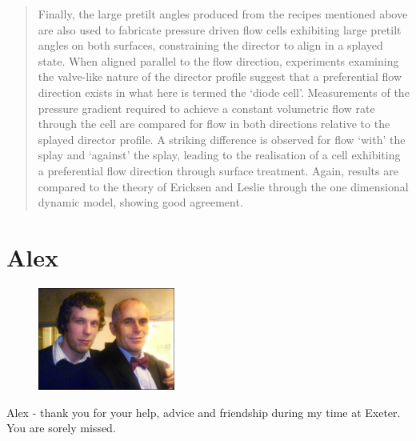 \documentclass[prb, reprint, superscriptaddress, eqsecnum]{revtex4-1}
\begin{document}
\begin{abstract}
Finally, the large pretilt angles produced from the recipes mentioned above are also used to fabricate pressure driven flow cells exhibiting large pretilt angles on both surfaces, constraining the director to align in a splayed state. When aligned parallel to the flow direction, experiments examining the valve-like nature of the director profile suggest that a preferential flow direction exists in what here is termed the `diode cell'. Measurements of the pressure gradient required to achieve a constant volumetric flow rate through the cell are compared for flow in both directions relative to the splayed director profile. A striking difference is observed for flow `with' the splay and `against' the splay, leading to the realisation of a cell exhibiting a preferential flow direction through surface treatment. Again, results are compared to the theory of Ericksen and Leslie through the one dimensional dynamic model, showing good agreement.
\end{abstract}

\maketitle

\pagestyle{fancy}









% 
% 

% 


\section{Alex}
\begin{figure}[h]
\begin{center}
\includegraphics[width=0.4\textwidth]{figures/alex.jpg}
\end{center}
\end{figure}

\begin{center}
Alex - thank you for your help, advice and friendship during my time at Exeter. You are sorely missed.
\end{center}
\end{document}
